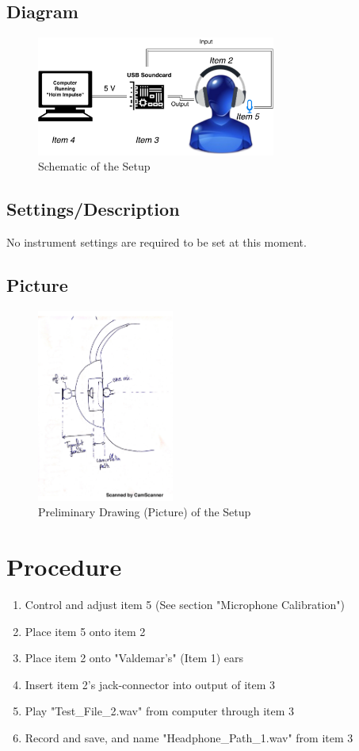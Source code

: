 \documentclass[12pt,a4paper,openright]{article}
\begin{document}
\subsection{Diagram}
\begin{figure}[H]
	\centering
	\includegraphics[width=0.7\textwidth]{Schem2.pdf}
	\caption{Schematic of the Setup}
	\label{Schematic}
\end{figure}

\subsection{Settings/Description}
No instrument settings are required to be set at this moment.

\subsection{Picture}
\begin{figure}[H]
	\centering
	\includegraphics[width=0.4\textwidth]{picture.png}
	\caption{Preliminary Drawing (Picture) of the Setup}
	\label{PictureDrawing}
\end{figure}

\section{Procedure}
\begin{enumerate}
	\item Control and adjust item 5 (See section "Microphone Calibration")
	\item Place item 5 onto item 2
	\item Place item 2 onto "Valdemar's" (Item 1) ears
	\item Insert item 2's jack-connector into output of item 3
	\item Play "Test\_File\_2.wav" from computer through item 3
	\item Record and save, and name "Headphone\_Path\_1.wav" from item 3
\end{enumerate}
\end{document}
